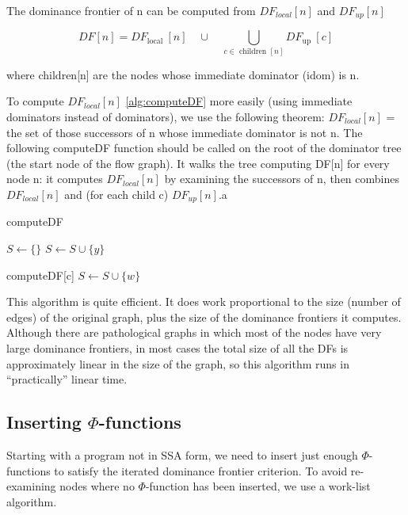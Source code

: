 The dominance frontier of n can be computed from $DF_{local}[n]$  and $DF_{up}[n]$ 


$$
D F[n]=D F_{\text {local }}[n] \quad \cup \quad \bigcup_{c \in \text { children }[n]} D F_{\text {up }}[c]
$$

where children[n] are the nodes whose immediate dominator (idom) is n.


To compute $DF_{local}[n]$ \ref{alg:computeDF} more easily (using immediate dominators instead of dominators), we use the following theorem: $DF_{local}[n]$ = the set of those successors of n whose immediate dominator is not n. The following computeDF function should be called on the root of the dominator tree (the start node of the flow graph). It walks the tree computing DF[n] for every node n: it computes $DF_{local}[n]$ by examining the successors of n, then combines $DF_{local}[n]$ and (for each child c) $DF_{up}[n]$.a

\begin{algorithm}
\caption{computeDF}\label{alg:computeDF}
\begin{algorithmic}

\State $S \gets \{\}$
 
\State $S\leftarrow S \cup \{y\}$
\EndIf 
\EndFor

\State computeDF[c]
 
\State $S\leftarrow S \cup \{w\}$
\EndIf 
\EndFor
\EndFor
\end{algorithmic}
\end{algorithm}

This algorithm is quite efficient. It does work proportional to the size (number of edges) of the original graph, plus the size of the dominance frontiers it computes. Although there are pathological graphs in which most of the nodes have very large dominance frontiers, in most cases the total size of all the DFs is approximately linear in the size of the graph, so this algorithm runs in “practically” linear time.




\subsection{Inserting $\Phi$-functions}

Starting with a program not in SSA form, we need to insert just enough $\Phi$-functions to satisfy the iterated dominance frontier criterion. To avoid re-examining nodes where no $\Phi$-function has been inserted, we use a work-list algorithm.

